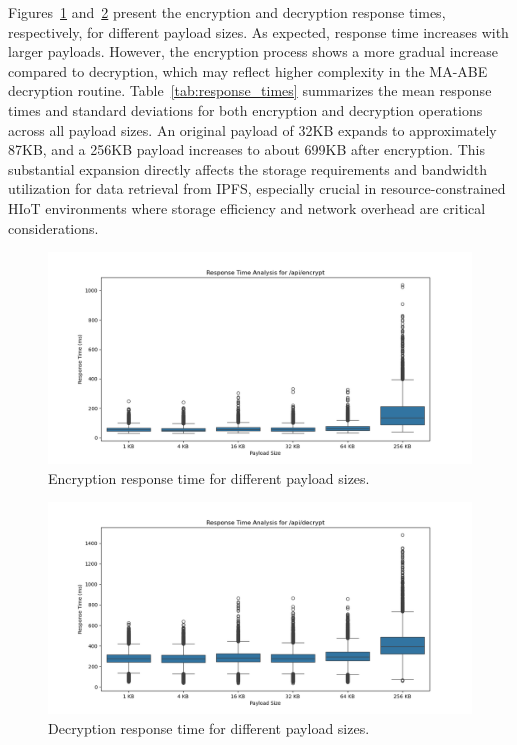 \documentclass[cic,tc,english]{iiufrgs}
\numberwithin{algorithm}{chapter}
\begin{document}
            Figures~\ref{fig:encrypt_payload_size} and~\ref{fig:decrypt_payload_size} present the encryption and decryption response times, respectively, for different payload sizes. As expected, response time increases with larger payloads. However, the encryption process shows a more gradual increase compared to decryption, which may reflect higher complexity in the MA-ABE decryption routine. Table~\ref{tab:response_times} summarizes the mean response times and standard deviations for both encryption and decryption operations across all payload sizes. An original payload of 32KB expands to approximately 87KB, and a 256KB payload increases to about 699KB after encryption. This substantial expansion directly affects the storage requirements and bandwidth utilization for data retrieval from IPFS, especially crucial in resource-constrained HIoT environments where storage efficiency and network overhead are critical considerations. 
            

            \begin{figure}
                \centering
                \includegraphics[width=\textwidth]{images/phase2/response_time_api_encrypt.png}
                \caption{Encryption response time for different payload sizes.}
                \label{fig:encrypt_payload_size}
            \end{figure}

            \begin{figure}
                \centering
                \includegraphics[width=\textwidth]{images/phase2/response_time_api_decrypt.png}
                \caption{Decryption response time for different payload sizes.}
                \label{fig:decrypt_payload_size}
            \end{figure}
\end{document}
